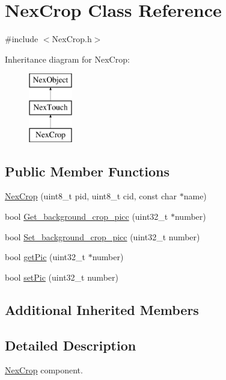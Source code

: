 \hypertarget{class_nex_crop}{\section{Nex\+Crop Class Reference}
\label{class_nex_crop}
}


{\ttfamily \#include $<$Nex\+Crop.\+h$>$}

Inheritance diagram for Nex\+Crop\+:\begin{figure}[H]
\begin{center}
\leavevmode
\includegraphics[height=3.000000cm]{class_nex_crop}
\end{center}
\end{figure}
\subsection*{Public Member Functions}
\begin{DoxyCompactItemize}
\item 
\hyperlink{class_nex_crop_a1a3a195d3da05cb832f91a2ef43f27d3}{Nex\+Crop} (uint8\+\_\+t pid, uint8\+\_\+t cid, const char $\ast$name)
\item 
bool \hyperlink{class_nex_crop_a19f824bea045bab4cc1afc5950259247}{Get\+\_\+background\+\_\+crop\+\_\+picc} (uint32\+\_\+t $\ast$number)
\item 
bool \hyperlink{class_nex_crop_aa85a69de5055c29f0a85406d10806bfe}{Set\+\_\+background\+\_\+crop\+\_\+picc} (uint32\+\_\+t number)
\item 
bool \hyperlink{class_nex_crop_a2cbfe125182626965dd530f14ab55885}{get\+Pic} (uint32\+\_\+t $\ast$number)
\item 
bool \hyperlink{class_nex_crop_aac34fc2f8ead1e330918089ea8a339db}{set\+Pic} (uint32\+\_\+t number)
\end{DoxyCompactItemize}
\subsection*{Additional Inherited Members}


\subsection{Detailed Description}
\hyperlink{class_nex_crop}{Nex\+Crop} component. 


